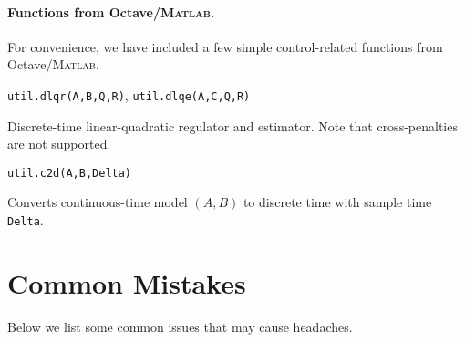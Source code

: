 \documentclass{article}
\newcommand{\funcname}[2][.25em]{\vspace{#1}\noindent\texttt{#2}\nopagebreak\vspace{#1}}
\begin{document}
\begin{multicols}{2}
\paragraph*{Functions from Octave/\textsc{Matlab}.}

For convenience, we have included a few simple control-related functions from Octave/\textsc{Matlab}.

\funcname{util.dlqr(A,B,Q,R)}, \funcname[0pt]{util.dlqe(A,C,Q,R)}

Discrete-time linear-quadratic regulator and estimator.
Note that cross-penalties are not supported.

\funcname{util.c2d(A,B,Delta)}

Converts continuous-time model $(A,B)$ to discrete time with sample time \texttt{Delta}.

\end{multicols}

\section{Common Mistakes}

Below we list some common issues that may cause headaches.
\end{document}
